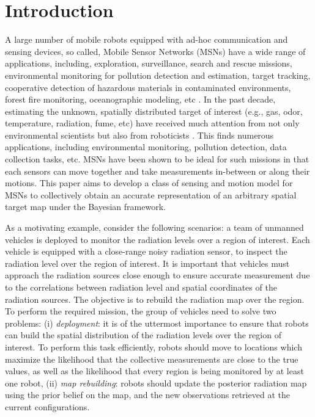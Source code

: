 \documentclass[journal]{IEEEtran}
\begin{document}
%
\IEEEpeerreviewmaketitle


\section{Introduction}
\label{sec:sec1}
A large number of mobile robots equipped with ad-hoc communication and sensing devices, so called, Mobile Sensor Networks (MSNs) have a wide range of applications, including, exploration, surveillance, search and rescue missions, environmental
monitoring for pollution detection and estimation, target tracking, cooperative detection of hazardous materials in contaminated environments, forest fire monitoring, oceanographic modeling, etc \cite{dhillon2003sensor,howard2002mobile,cortes_coverage_2004,yu2005real}. In the past decade, estimating the unknown, spatially distributed target of interest (e.g., gas, odor, temperature, radiation, fume, etc) have received much attention from not only environmental scientists \cite{chuvieco1996mapping} but also from roboticists \cite{cortez2008smart,choi2010continuous,ristic2010information}. This finds numerous applications, including environmental monitoring, pollution detection, data collection tasks, etc.
MSNs have been shown to be ideal for such missions in that each sensors can move together and take measurements in-between or along their motions.
This paper aims to develop a class of sensing and motion model for MSNs to collectively obtain an accurate representation of an arbitrary spatial target map under the Bayesian framework.

As a motivating example, consider the following scenarios: a team of unmanned vehicles is deployed to monitor the radiation levels over a region of interest. Each vehicle is equipped with a close-range noisy radiation sensor, to inspect the radiation level over the region of interest. It is important that vehicles must approach the radiation sources close enough to ensure accurate measurement due to the correlations between radiation level and spatial coordinates of the radiation sources. The objective is to rebuild the radiation map over the region.
To perform the required mission, the group of vehicles need to solve two problems: (i) \emph{deployment}: it is of the uttermost importance to ensure that robots can build the spatial distribution of the radiation levels over the region of interest. To perform this task efficiently, robots should move to locations which 
maximize the likelihood that the collective measurements are close to the true values, as well as the likelihood that every region is being monitored by at least one robot, (ii) \emph{map rebuilding}: robots should update the posterior radiation map using the prior belief on the map, and the new observations retrieved at the current configurations. 
\end{document}
